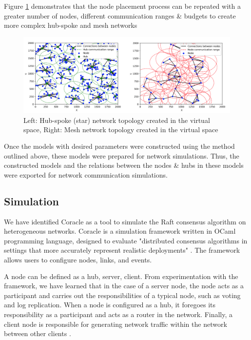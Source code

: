 Figure \ref{fig:modeling_complex} demonstrates that the node placement process can be repeated with a greater number of nodes, different communication ranges \& budgets to create more complex hub-spoke and mesh networks
\begin{figure}[H]
    \centering
    \includegraphics[width=0.75\columnwidth]{images/modeling_complex_unified.png}
    \caption{Left: Hub-spoke (star) network topology created in the virtual space, Right: Mesh network topology created in the virtual space}
    \label{fig:modeling_complex}
\end{figure}

Once the models with desired parameters were constructed using the method outlined above, these models were prepared for network simulations. Thus, the constructed models and the relations between the nodes \& hubs in these models were exported for network communication simulations.




\subsection{Simulation}
We have identified Coracle \cite{Coracle} as a tool to simulate the Raft consensus algorithm on heterogeneous networks. Coracle is a simulation framework written in OCaml programming language, designed to evaluate "distributed consensus algorithms in settings that more accurately represent realistic deployments" \cite{howardCoracleEvaluatingConsensus2015}. The framework allows users to configure nodes, links, and events. 

A node can be defined as a hub, server, client. From experimentation with the framework, we have learned that in the case of a server node, the node acts as a participant and carries out the responsibilities of a typical node, such as voting and log replication. When a node is configured as a hub, it foregoes its responsibility as a participant and acts as a router in the network. Finally, a client node is responsible for generating network traffic within the network between other clients \cite{howardCoracleEvaluatingConsensus2015}.

